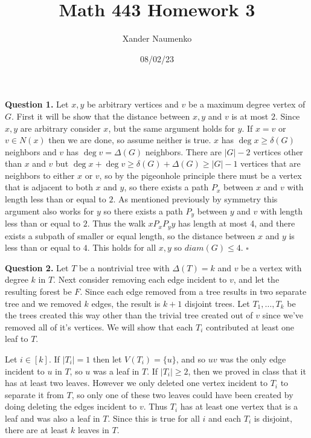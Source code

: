\documentclass[letterpaper, reqno,11pt]{article}
\begin{document}
\title{Math 443 Homework 3}
\date{08/02/23}
\author{Xander Naumenko}
\maketitle

{\medskip\noindent\bf Question 1.} Let $x,y$ be arbitrary vertices and $v$ be a maximum degree vertex of $G$. First it will be show that the distance between $x,y$ and $v$ is at most $2$. Since $x,y$ are arbitrary consider $x$, but the same argument holds for $y$. If $x=v$ or $v\in N(x)$ then we are done, so assume neither is true. $x$ has $\deg x\geq \delta(G)$ neighbors and $v$ has $\deg v=\Delta(G)$ neighbors. There are $|G|-2$ vertices other than $x$ and $v$ but $\deg x+\deg v\geq \delta(G)+\Delta(G)\geq |G|-1$ vertices that are neighbors to either $x$ or $v$, so by the pigeonhole principle there must be a vertex that is adjacent to both $x$ and $y$, so there exists a path $P_x$ between $x$ and $v$ with length less than or equal to $2$. As mentioned previously by symmetry this argument also works for $y$ so there exists a path $P_y$ between $y$ and $v$ with length less than or equal to $2$. Thus the walk $xP_xP_y y$ has length at most 4, and there exists a subpath of smaller or equal length, so the distance between $x$ and $y$ is less than or equal to $4$. This holds for all $x,y$ so $diam(G)\leq 4$. $\square$

{\medskip\noindent\bf Question 2.} Let $T$ be a nontrivial tree with $\Delta(T)=k$ and $v$ be a vertex with degree $k$ in $T$. Next consider removing each edge incident to $v$, and let the resulting forest be $F$. Since each edge removed from a tree results in two separate tree and we removed $k$ edges, the result is $k+1$ disjoint trees. Let $T_1, \ldots, T_k$ be the trees created this way other than the trivial tree created out of $v$ since we've removed all of it's vertices. We will show that each $T_i$ contributed at least one leaf to $T$. 

Let $i\in[k]$. If $|T_i|=1$ then let $V(T_i)=\{u\}$, and so $uv$ was the only edge incident to $u$ in $T$, so $u$ was a leaf in $T$. If $|T_i|\geq 2$, then we proved in class that it has at least two leaves. However we only deleted one vertex incident to $T_i$ to separate it from $T$, so only one of these two leaves could have been created by doing deleting the edges incident to $v$. Thus $T_i$ has at least one vertex that is a leaf and was also a leaf in $T$. Since this is true for all $i$ and each $T_i$ is disjoint, there are at least $k$ leaves in $T$. 
\end{document}
